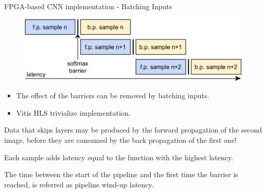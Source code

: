 \begin{frame}{FPGA-based CNN implementation - Batching Inputs}
	\begin{minipage}{0.5\textwidth}
    	\begin{figure}[H]
            \centering
    		\includegraphics[width=1\textwidth]{Images/Diagrams/pipeline_under_batching.png}
    	\end{figure}%
	\end{minipage}%
	\begin{minipage}{0.5\textwidth}
    	\begin{itemize}
    	    \item The effect of the barriers can be removed by batching inputs.
    	    \item Vitis HLS trivialize implementation.
    	\end{itemize}
	\end{minipage}%
	
	Data that skips layers may be produced by the forward propagation of the second image, before they are consumed by the back propagation of the first one!
	
	Each sample adds latency equal to the function with the highest latency.
	
	The time between the start of the pipeline and the first time the barrier is reached, is referred as pipeline wind-up latency.
\end{frame}

    
    
    

